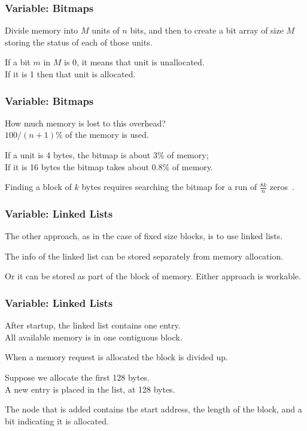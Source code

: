 \begin{frame}
\frametitle{Variable: Bitmaps}

Divide memory into $M$ units of $n$ bits, and then to create a bit array of size $M$ storing the status of each of those units. 

If a bit $m$ in $M$ is 0, it means that unit is unallocated.\\
If it is 1 then that unit is allocated. 

\end{frame}

\begin{frame}
\frametitle{Variable: Bitmaps}


How much memory is lost to this overhead?\\
\quad $100/(n+1)$\% of the memory is used. 

If a unit is 4 bytes, the bitmap is about 3\% of memory; \\
If it is 16 bytes the bitmap takes about 0.8\% of memory. 

Finding a block of $k$ bytes requires searching the bitmap for a run of $\frac{8k}{n}$ zeros~.

\end{frame}

\begin{frame}
\frametitle{Variable: Linked Lists}

The other approach, as in the case of fixed size blocks, is to use linked lists. 

The info of the linked list can be stored separately from memory allocation.

Or it can be stored as part of the block of memory. Either approach is workable.

\end{frame}

\begin{frame}
\frametitle{Variable: Linked Lists}

After startup, the linked list contains one entry.\\
\quad  All available memory is in one contiguous block. 

When a memory request is allocated the block is divided up. 

Suppose we allocate the first 128 bytes.\\
\quad A new entry is placed in the list, at 128 bytes. 

The node that is added contains the start address, the length of the block, and a bit indicating it is allocated. 

\end{frame}

